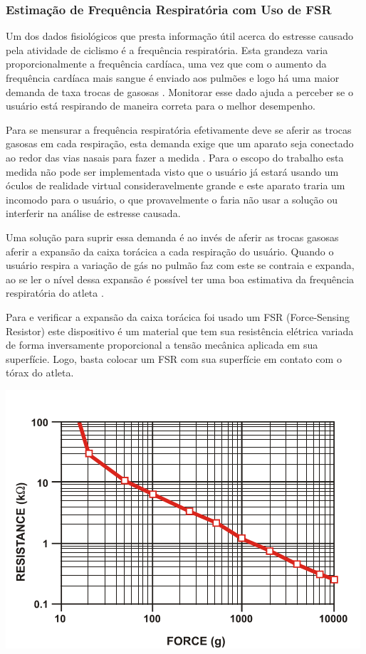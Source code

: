 \subsubsection{Estimação de Frequência Respiratória com Uso de FSR}

	Um dos dados fisiológicos que presta informação útil acerca do estresse causado pela atividade de ciclismo é a frequência respiratória. Esta grandeza varia proporcionalmente a frequência cardíaca, uma vez que com o aumento da frequência cardíaca mais sangue é enviado aos pulmões e logo há uma maior demanda de taxa trocas de gasosas \cite{rosero}.  Monitorar esse dado ajuda a perceber se o usuário está respirando de maneira correta para o melhor desempenho.
    
	Para se mensurar a frequência respiratória efetivamente deve se aferir as trocas gasosas em cada respiração, esta demanda exige que um aparato seja conectado ao redor das vias nasais para fazer a medida \cite{miranda2015}. Para o escopo do trabalho esta medida não pode ser implementada visto que o usuário já estará usando um óculos de realidade virtual consideravelmente grande e este aparato traria um incomodo para o usuário, o que provavelmente o faria não usar a solução ou interferir na análise de estresse causada.
    
	Uma solução para suprir essa demanda é ao invés de aferir as trocas gasosas aferir a expansão da caixa torácica a cada respiração do usuário. Quando o usuário respira a variação de gás no pulmão faz com este se contraia e expanda, ao se ler o nível dessa expansão é possível ter uma boa estimativa da frequência respiratória do atleta \cite{miranda2015}.
    
	Para e verificar a expansão da caixa torácica foi usado um FSR (Force-Sensing Resistor) este dispositivo é um material que tem sua resistência elétrica variada de forma inversamente proporcional a tensão mecânica aplicada em sua superfície. Logo, basta colocar um FSR com sua superfície em contato com o tórax do atleta.
    
    \begin{center}
    	\includegraphics[scale=0.5]{figuras/fsr_resistance_force.png}
        \label{fsr_curve}
    \end{center}

